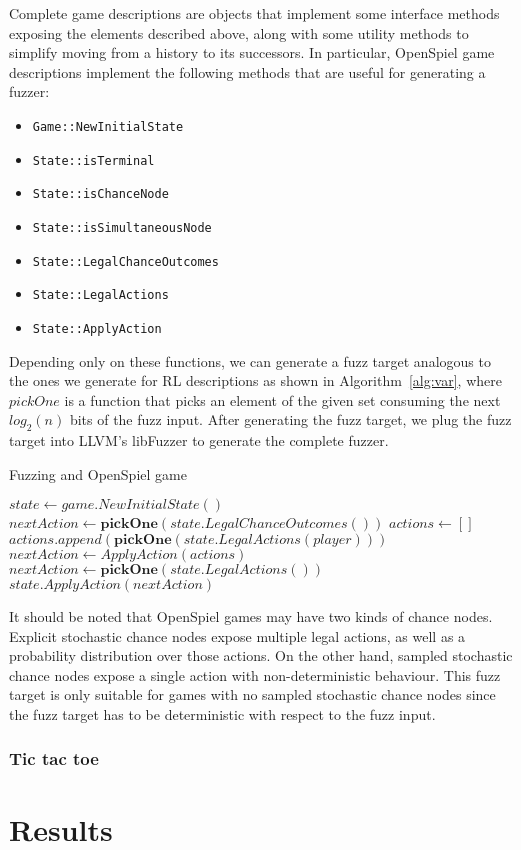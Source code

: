 Complete game descriptions are objects that implement some interface methods exposing the elements 
described above, along with some utility methods to simplify moving from a history to its successors.
In particular, OpenSpiel game descriptions implement the following methods that are useful for generating a fuzzer:
\begin{itemize}
    \item \texttt{Game::NewInitialState}
    \item \texttt{State::isTerminal}
    \item \texttt{State::isChanceNode}
    \item \texttt{State::isSimultaneousNode}
    \item \texttt{State::LegalChanceOutcomes}
    \item \texttt{State::LegalActions}
    \item \texttt{State::ApplyAction}
\end{itemize}
Depending only on these functions, we can generate a fuzz target analogous to the ones we generate for RL descriptions 
as shown in Algorithm~\ref{alg:var}, where $pickOne$ is a function that picks an element of the given set consuming the next $log_2(n)$ bits of 
the fuzz input. After generating the fuzz target, we plug the fuzz target into LLVM's libFuzzer
to generate the complete fuzzer.

\begin{algorithm}[H]
    \caption{Fuzzing and OpenSpiel game}
    \label{alg:var}
    \begin{algorithmic}[1]
    \STATE $state \gets game.NewInitialState()$
            \STATE $nextAction \gets \pmb{pickOne}(state.LegalChanceOutcomes())$
            \STATE $actions \gets []$
                \STATE $actions.append(\pmb{pickOne}(state.LegalActions(player)))$
            \ENDFOR
            \STATE $nextAction \gets ApplyAction(actions)$
        \ELSE
            \STATE $nextAction \gets \pmb{pickOne}(state.LegalActions())$
        \ENDIF
        \STATE $state.ApplyAction(nextAction)$
    \ENDWHILE
    \end{algorithmic}
\end{algorithm}

It should be noted that OpenSpiel games may have two kinds of chance nodes. Explicit stochastic chance nodes
expose multiple legal actions, as well as a probability distribution over those actions. On the other hand, 
sampled stochastic chance nodes expose a single action with non-deterministic behaviour. This fuzz target is 
only suitable for games with no sampled stochastic chance nodes since the fuzz target has to be deterministic
with respect to the fuzz input.

\subsubsection{Tic tac toe}

\section{Results}